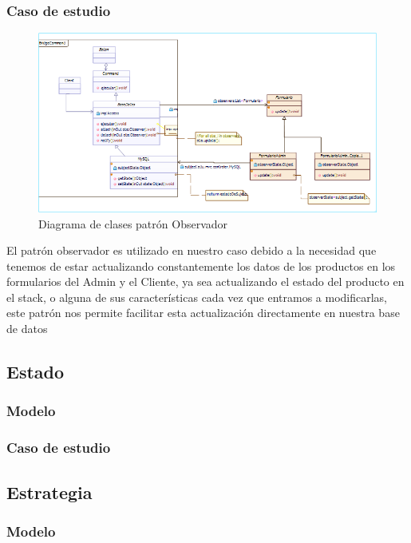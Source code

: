 \subsubsection{Caso de estudio}
	\begin{figure}[h!]
	\centering
	\includegraphics[width=1.0\linewidth]{arquitectura/imagenes/DiagramaObservador}
	\caption{Diagrama de clases patrón Observador}
\end{figure}



El patrón observador es utilizado en nuestro caso debido a la necesidad que tenemos de estar actualizando constantemente los datos de los productos en los formularios del Admin y el Cliente, ya sea actualizando el estado del producto en el stack, o alguna de sus características cada vez que entramos a modificarlas, este patrón nos permite facilitar esta actualización directamente en nuestra base de datos
\newpage

\newpage

\subsection{Estado}
\subsubsection{Modelo}
\newpage
\subsubsection{Caso de estudio}
\newpage

\subsection{Estrategia}
\subsubsection{Modelo}
\newpage
